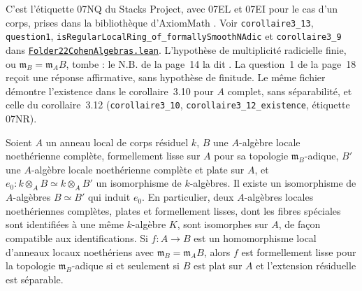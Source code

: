 \noindent C'est l'étiquette 07NQ du Stacks Project, avec 07EL et 07EI pour le cas d'un corps, prises dans la bibliothèque d'AxiomMath \cite{axiomstacks}. Voir \texttt{corollaire3\_13}, \texttt{question1}, \texttt{isRegularLocalRing\_of\_formallySmoothNAdic} et \texttt{corollaire3\_9} dans \href{\leanblobmain/RingTheory/Folder22CohenAlgebras.lean}{\texttt{Folder22CohenAlgebras.\allowbreak{}lean}}. L'hypothèse de multiplicité radicielle finie, ou $\mathfrak m_B = \mathfrak m_A B$, tombe : le N.B. de la page~14 la dit . La question~1 de la page~18 reçoit une réponse affirmative, sans hypothèse de finitude. Le même fichier démontre l'existence dans le corollaire~3.10 pour $A$ complet, sans séparabilité, et celle du corollaire~3.12 (\texttt{corollaire3\_10}, \texttt{corollaire3\_12\_existence}, étiquette 07NR).

\begin{encadre}
\begin{theoreme}
Soient $A$ un anneau local de corps résiduel $k$, $B$ une $A$-algèbre locale noethérienne complète, formellement lisse sur $A$ pour sa topologie $\mathfrak m_B$-adique, $B'$ une $A$-algèbre locale noethérienne complète et plate sur $A$, et $e_0 : k \otimes_A B \simeq k \otimes_A B'$ un isomorphisme de $k$-algèbres. Il existe un isomorphisme de $A$-algèbres $B \simeq B'$ qui induit $e_0$. En particulier, deux $A$-algèbres locales noethériennes complètes, plates et formellement lisses, dont les fibres spéciales sont identifiées à une même $k$-algèbre $K$, sont isomorphes sur $A$, de façon compatible aux identifications. Si $f : A \to B$ est un homomorphisme local d'anneaux locaux noethériens avec $\mathfrak m_B = \mathfrak m_A B$, alors $f$ est formellement lisse pour la topologie $\mathfrak m_B$-adique si et seulement si $B$ est plat sur $A$ et l'extension résiduelle est séparable.
\end{theoreme}
\end{encadre}

